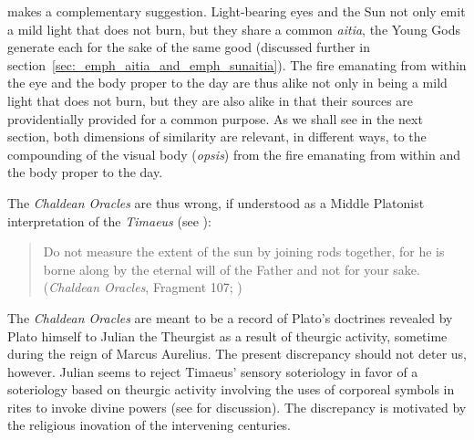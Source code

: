 \citet[112]{Johansen:2004dx} makes a complementary suggestion. Light-bearing eyes and the Sun not only emit a mild light that does not burn, but they share a common \emph{aitia}, the Young Gods generate each for the sake of the same good (discussed further in section~\ref{sec:_emph_aitia_and_emph_sunaitia}). The fire emanating from within the eye and the body proper to the day are thus alike not only in being a mild light that does not burn, but they are also alike in that their sources are providentially provided for a common purpose. As we shall see in the next section, both dimensions of similarity are relevant, in different ways, to the compounding of the visual body (\emph{opsis}) from the fire emanating from within and the body proper to the day.

The \emph{Chaldean Oracles} are thus wrong, if understood as a Middle Platonist interpretation of the \emph{Timaeus} (see \citealt{Brisson:2003aa}):
\begin{quote}
	Do not measure the extent of the sun by joining rods together, for he is borne along by the eternal will of the Father and not for your sake. (\emph{Chaldean Oracles}, Fragment 107; \citealt[89--91]{Majercik:2013jw})
\end{quote} 
The \emph{Chaldean Oracles} are meant to be a record of Plato's doctrines revealed by Plato himself to Julian the Theurgist as a result of theurgic activity, sometime during the reign of Marcus Aurelius. The present discrepancy should not deter us, however. Julian seems to reject Timaeus' sensory soteriology in favor of a soteriology based on theurgic activity involving the uses of corporeal symbols in rites to invoke divine powers (see \citealt[21--25]{Majercik:2013jw} for discussion). The discrepancy is motivated by the religious inovation of the intervening centuries.

